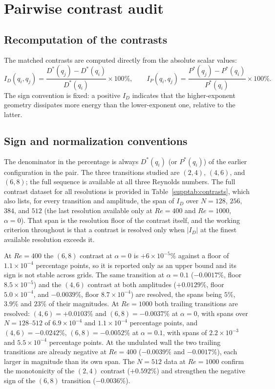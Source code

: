 \section{Pairwise contrast audit}
\label{suppsec:contrasts}

\subsection{Recomputation of the contrasts}

The matched contrasts are computed directly from the absolute scalar values:
\begin{equation}
I_D(q_i,q_j) = \frac{D^*(q_j)-D^*(q_i)}{D^*(q_i)}\times 100\%, \qquad
I_P(q_i,q_j) = \frac{P^*(q_j)-P^*(q_i)}{P^*(q_i)}\times 100\%.
\end{equation}
The sign convention is fixed: a positive $I_D$ indicates that the higher-exponent geometry dissipates more energy than the lower-exponent one, relative to the latter.

\subsection{Sign and normalization conventions}

The denominator in the percentage is always $D^*(q_i)$ (or $P^*(q_i)$) of the earlier configuration in the pair. The three transitions studied are $(2,4)$, $(4,6)$, and $(6,8)$; the full sequence is available at all three Reynolds numbers. The full contrast dataset for all resolutions is provided in Table~\ref{supptab:contrasts}, which also lists, for every transition and amplitude, the span of $I_D$ over $N=128$, $256$, $384$, and $512$ (the last resolution available only at $Re=400$ and $Re=1000$, $\alpha=0$). That span is the resolution floor of the contrast itself, and the working criterion throughout is that a contrast is resolved only when $|I_D|$ at the finest available resolution exceeds it.

At $Re=400$ the $(6,8)$ contrast at $\alpha=0$ is $+6\times 10^{-5}\%$ against a floor of $1.1\times 10^{-4}$ percentage points, so it is reported only as an upper bound and its sign is not stable across grids. The same transition at $\alpha=0.1$ ($-0.0017\%$, floor $8.5\times 10^{-5}$) and the $(4,6)$ contrast at both amplitudes ($+0.0129\%$, floor $5.0\times 10^{-4}$, and $-0.0039\%$, floor $8.7\times 10^{-4}$) are resolved, the spans being $5\%$, $3.9\%$ and $23\%$ of their magnitudes. At $Re=1000$ both trailing transitions are resolved: $(4,6)=+0.0103\%$ and $(6,8)=-0.0037\%$ at $\alpha=0$, with spans over $N=128$--$512$ of $6.9\times10^{-4}$ and $1.1\times10^{-4}$ percentage points, and $(4,6)=-0.0242\%$, $(6,8)=-0.0052\%$ at $\alpha=0.1$, with spans of $2.2\times10^{-3}$ and $5.5\times10^{-4}$ percentage points. At the undulated wall the two trailing transitions are already negative at $Re=400$ ($-0.0039\%$ and $-0.0017\%$), each larger in magnitude than its own span. The $N=512$ data at $Re=1000$ confirm the monotonicity of the $(2,4)$ contrast ($+0.592\%$) and strengthen the negative sign of the $(6,8)$ transition ($-0.0036\%$).


